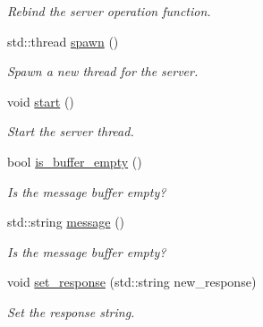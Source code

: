 \begin{DoxyCompactItemize}
\begin{DoxyCompactList}\small\item\em Rebind the server operation function. \end{DoxyCompactList}\item 
std\-::thread \hyperlink{classzcm_1_1Server_a77c0b86016dce3e6cef6a64118edd584}{spawn} ()
\begin{DoxyCompactList}\small\item\em Spawn a new thread for the server. \end{DoxyCompactList}\item 
void \hyperlink{classzcm_1_1Server_ab94400c32a097989a769cfb1d77936b4}{start} ()
\begin{DoxyCompactList}\small\item\em Start the server thread. \end{DoxyCompactList}\item 
bool \hyperlink{classzcm_1_1Server_a9b11ed1a79a2f11ee6ff747937b428b0}{is\-\_\-buffer\-\_\-empty} ()
\begin{DoxyCompactList}\small\item\em Is the message buffer empty? \end{DoxyCompactList}\item 
std\-::string \hyperlink{classzcm_1_1Server_a42259ad44d7f6cb7ef8a8ea105889f40}{message} ()
\begin{DoxyCompactList}\small\item\em Is the message buffer empty? \end{DoxyCompactList}\item 
void \hyperlink{classzcm_1_1Server_a78ed8fd8fae034a9f79c181f3b0a4ee1}{set\-\_\-response} (std\-::string new\-\_\-response)
\begin{DoxyCompactList}\small\item\em Set the response string. \end{DoxyCompactList}\end{DoxyCompactItemize}
